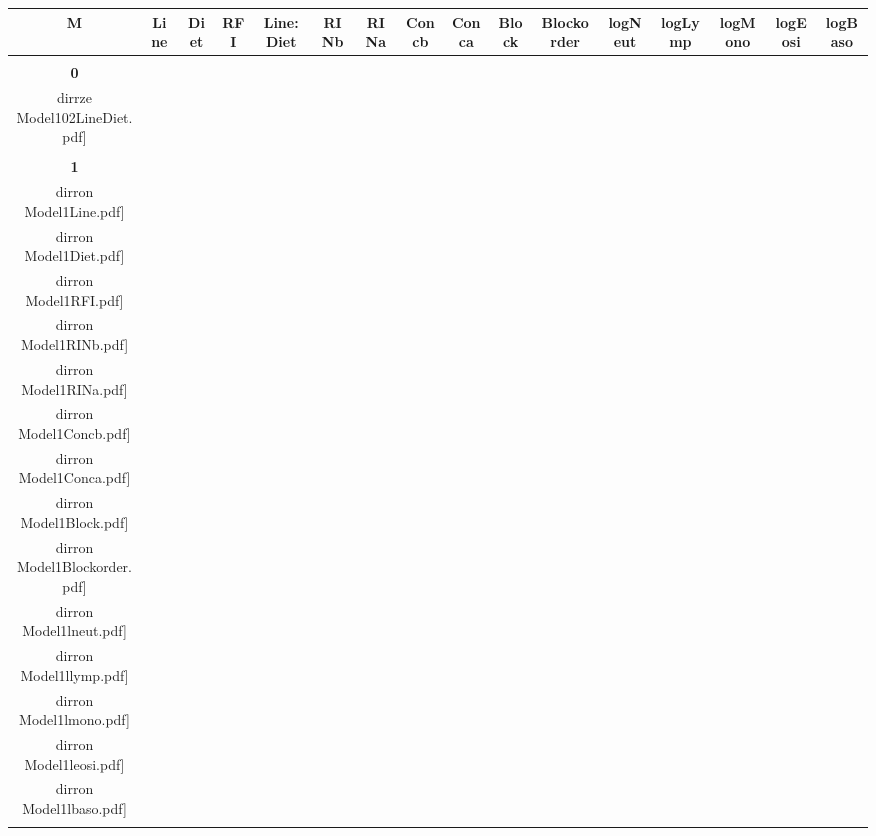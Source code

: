 \documentclass[landscape,a1paper, onecolumn]{paper}
\def\dirrze {/run/user/1000/gvfs/smb-share:server=cyfiles.iastate.edu,share=09/22/ntyet/R/RA/Data/RFI-newdata/result3/Model102.LineDiet/}
\def \dirron {/run/user/1000/gvfs/smb-share:server=cyfiles.iastate.edu,share=09/22/ntyet/R/RA/Data/RFI-newdata/result4/Model1.Line.Diet.RFI.Concb.RINb.Conca.RINa.lneut.llymp.lmono.leosi.lbaso.Block.Blockorder/}
\begin{document}
\begin{table}
\Huge
\centering
\begin{tabular}{cccccccccccccccc}
      {\Huge \textbf{M}} 
      & {\Huge\textbf{ Line}} 
      &{\Huge \textbf{Diet}} 
      & {\Huge \textbf{RFI}}
      &{\Huge \textbf{Line:Diet}} 
      &{\Huge\textbf{ RINb}} 
      &{\Huge \textbf{RINa}} 
      &{\Huge \textbf{Concb} } 
      &{\Huge \textbf{Conca} }
      &{\Huge \textbf{Block}} 
      &{\Huge \textbf{Blockorder}}
      &{\Huge \textbf{logNeut}}
      &{\Huge \textbf{logLymp}}
      &{\Huge \textbf{logMono}}
      &{\Huge \textbf{logEosi}}
      &{\Huge \textbf{logBaso}}
      \\[5pt]
      \hline
      \\[5pt]
      
      {\Huge \textbf{0}} 
      &
      &
      &
      &\texttt{[image: \\dirrze Model102LineDiet.pdf]}
      &
      &
      &
      &
      &
      &
      &
      &
      &
      &
      &
     \\[5pt]
     \hline
     \\[5pt]
     
      {\Huge \textbf{1}} 
      &\texttt{[image: \\dirron Model1Line.pdf]}
      &\texttt{[image: \\dirron Model1Diet.pdf]}
      &\texttt{[image: \\dirron Model1RFI.pdf]}
      &
      &\texttt{[image: \\dirron Model1RINb.pdf]}
      &\texttt{[image: \\dirron Model1RINa.pdf]}
      &\texttt{[image: \\dirron Model1Concb.pdf]}
      &\texttt{[image: \\dirron Model1Conca.pdf]}
      &\texttt{[image: \\dirron Model1Block.pdf]}
      &\texttt{[image: \\dirron Model1Blockorder.pdf]}
      &\texttt{[image: \\dirron Model1lneut.pdf]}
      &\texttt{[image: \\dirron Model1llymp.pdf]}
      &\texttt{[image: \\dirron Model1lmono.pdf]}
      &\texttt{[image: \\dirron Model1leosi.pdf]}
      &\texttt{[image: \\dirron Model1lbaso.pdf]}
     \\[5pt]
     \hline
     \\[5pt]
     

\end{tabular}
\end{table}
\end{document}
